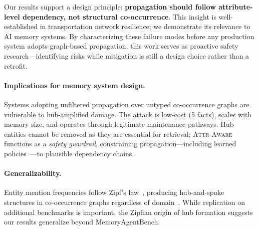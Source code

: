 \documentclass{article}
\newcommand{\attraware}{\textsc{Attr-Aware}}
\begin{document}
Our results support a design principle: \textbf{propagation should follow attribute-level dependency, not structural co-occurrence}.
This insight is well-established in transportation network resilience; we demonstrate its relevance to AI memory systems.
By characterizing these failure modes before any production system adopts graph-based propagation, this work serves as proactive safety research---identifying risks while mitigation is still a design choice rather than a retrofit.

\paragraph{Implications for memory system design.}
Systems adopting unfiltered propagation over untyped co-occurrence graphs are vulnerable to hub-amplified damage.
The attack is low-cost (5 facts), scales with memory size, and operates through legitimate maintenance pathways.
Hub entities cannot be removed as they are essential for retrieval; \attraware{} functions as a \textit{safety guardrail}, constraining propagation---including learned policies~\citep{mars_2025}---to plausible dependency chains.

\paragraph{Generalizability.}
Entity mention frequencies follow Zipf's law~\citep{zipf_1949}, producing hub-and-spoke structures in co-occurrence graphs regardless of domain~\citep{steyvers_semantic_2005, barabasi_scalefree_1999}.
While replication on additional benchmarks is important, the Zipfian origin of hub formation suggests our results generalize beyond MemoryAgentBench.
\end{document}
